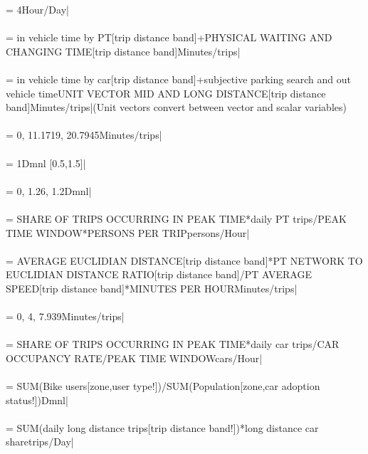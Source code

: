  = {\small 4Hour/Day|} \\ \\ 
 = {\small in vehicle time by PT[trip distance band]+PHYSICAL WAITING AND CHANGING TIME[trip distance band]Minutes/trips|} \\ \\ 
 = {\small in vehicle time by car[trip distance band]+subjective parking search and out vehicle time\*UNIT VECTOR MID AND LONG DISTANCE[trip distance band]Minutes/trips|}{\small  (Unit vectors convert between vector and scalar variables)} \\ \\ 
 = {\small 0, 11.1719, 20.7945Minutes/trips|} \\ \\ 
 = {\small 1Dmnl [0.5,1.5]|} \\ \\ 
 = {\small 0, 1.26, 1.2Dmnl|} \\ \\ 
 = {\small SHARE OF TRIPS OCCURRING IN PEAK TIME*daily PT trips/PEAK TIME WINDOW*PERSONS PER TRIPpersons/Hour|} \\ \\ 
 = {\small AVERAGE EUCLIDIAN DISTANCE[trip distance band]*PT NETWORK TO EUCLIDIAN DISTANCE RATIO[trip distance band]/PT AVERAGE SPEED[trip distance band]*MINUTES PER HOURMinutes/trips|} \\ \\ 
 = {\small 0, 4, 7.939Minutes/trips|} \\ \\ 
 = {\small SHARE OF TRIPS OCCURRING IN PEAK TIME*daily car trips/CAR OCCUPANCY RATE/PEAK TIME WINDOWcars/Hour|} \\ \\ 
 = {\small SUM(Bike users[zone,user type!])/SUM(Population[zone,car adoption status!])Dmnl|} \\ \\ 
 = {\small SUM(daily long distance trips[trip distance band!])*long distance car sharetrips/Day|} \\ \\ 
